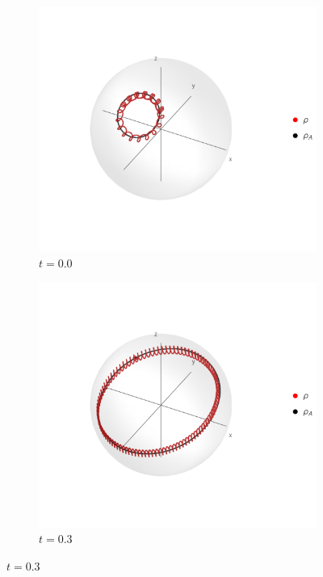 \begin{figure}[h!]
    \centering
    \begin{subfigure}{0.32\textwidth}
      \centering
      \includegraphics[width=0.9\linewidth]{maxent/figures/U1xU2_H1=(sy-sz)_H2=10(2sx-sy)_z=0.9_p=0.9.png}
      \caption{$t=0.0$}
    \end{subfigure}%
    \begin{subfigure}{0.32\textwidth}
      \centering
      \includegraphics[width=0.9\linewidth]{maxent/figures/U1xU2_H1=(sx-sy)_H2=100(sx+sy)_z=0.9_p=0.9.png}
      \caption{$t=0.3$}
    \end{subfigure}

\end{figure}
